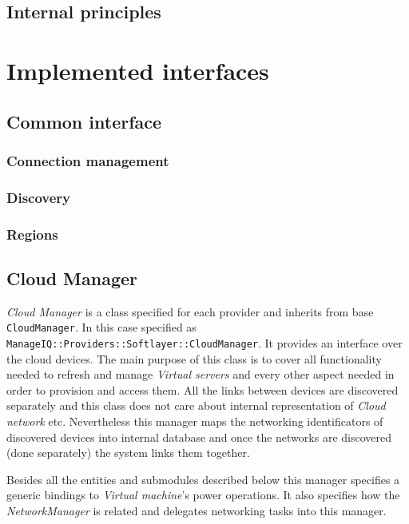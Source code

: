 \section{Internal principles}
\label{sec:Internal principles}

\chapter{Implemented interfaces}
\label{chap:Implemented interfaces}

\section{Common interface}
\label{sec:Common interface}

\subsection{Connection management}
\label{sub:Connection management}

\subsection{Discovery}
\label{sub:Discovery}

\subsection{Regions}
\label{sub:Regions}

\section{Cloud Manager}
\label{sec:Cloud Manager}

\emph{Cloud Manager} is a class specified for each provider and inherits from base \texttt{CloudManager}. In this case specified as \texttt{ManageIQ::Providers::Softlayer::CloudManager}. It provides an interface over the cloud devices. The main purpose of this class is to cover all functionality needed to refresh and manage \emph{Virtual servers} and every other aspect needed in order to provision and access them. All the links between devices are discovered separately and this class does not care about internal representation of \emph{Cloud network} etc. Nevertheless this manager maps the networking identificators of discovered devices into internal database and once the networks are discovered (done separately) the system links them together.

Besides all the entities and submodules described below this manager specifies a generic bindings to \emph{Virtual machine}'s power operations. It also specifies how the \emph{NetworkManager} is related and delegates networking tasks into this manager.

